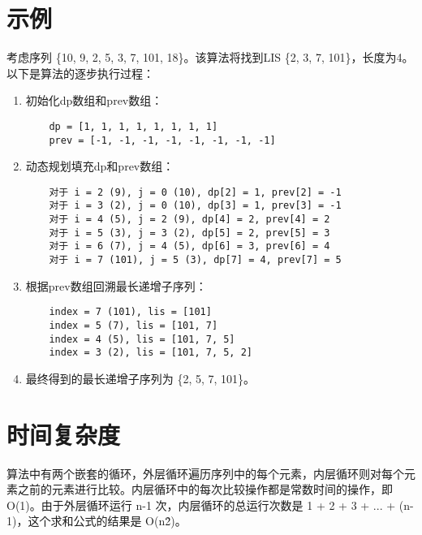\documentclass{article}
\begin{document}
\section{示例}
考虑序列 \{10, 9, 2, 5, 3, 7, 101, 18\}。该算法将找到LIS \{2, 3, 7, 101\}，长度为4。以下是算法的逐步执行过程：

\begin{enumerate}
    \item 初始化dp数组和prev数组：
    \begin{verbatim}
    dp = [1, 1, 1, 1, 1, 1, 1, 1]
    prev = [-1, -1, -1, -1, -1, -1, -1, -1]
    \end{verbatim}
    \item 动态规划填充dp和prev数组：
    \begin{verbatim}
    对于 i = 2 (9), j = 0 (10), dp[2] = 1, prev[2] = -1
    对于 i = 3 (2), j = 0 (10), dp[3] = 1, prev[3] = -1
    对于 i = 4 (5), j = 2 (9), dp[4] = 2, prev[4] = 2
    对于 i = 5 (3), j = 3 (2), dp[5] = 2, prev[5] = 3
    对于 i = 6 (7), j = 4 (5), dp[6] = 3, prev[6] = 4
    对于 i = 7 (101), j = 5 (3), dp[7] = 4, prev[7] = 5
    \end{verbatim}
    \item 根据prev数组回溯最长递增子序列：
    \begin{verbatim}
    index = 7 (101), lis = [101]
    index = 5 (7), lis = [101, 7]
    index = 4 (5), lis = [101, 7, 5]
    index = 3 (2), lis = [101, 7, 5, 2]
    \end{verbatim}
    \item 最终得到的最长递增子序列为 \{2, 5, 7, 101\}。
\end{enumerate}

\section{时间复杂度}

算法中有两个嵌套的循环，外层循环遍历序列中的每个元素，内层循环则对每个元素之前的元素进行比较。内层循环中的每次比较操作都是常数时间的操作，即 O(1)。由于外层循环运行 n-1 次，内层循环的总运行次数是 1 + 2 + 3 + ... + (n-1)，这个求和公式的结果是 O(n\^2)。
\end{document}
